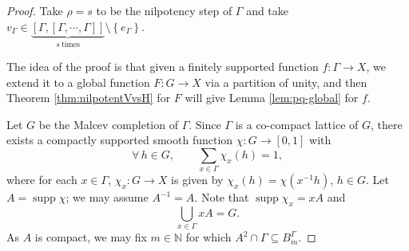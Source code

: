 \documentclass[10pt,a4paper]{amsart}
\begin{document}
\begin{proof}
Take $\rho=s$ to be the nilpotency step of $\Gamma$ and take $v_\Gamma \in \underbrace{\left[\Gamma,\left[\Gamma,\cdots,\Gamma\right]\right]}_{s\mathrm{~times}}\setminus\left\{e_{\Gamma}\right\}$. 

The idea of the proof is that given a finitely supported function $f:\Gamma\to X$, we extend it to a global function $F:G\to X$ via a partition of unity, and then Theorem \ref{thm:nilpotentVvsH} for $F$ will give Lemma \ref{lem:pq-global} for $f$.

Let $G$ be the Malcev completion of $\Gamma$. Since $\Gamma$ is a co-compact lattice of $G$, there exists a compactly supported smooth function $\chi:G\to \left[0,1\right]$ with
\begin{equation}\label{eq:partition of unity}
\forall\, h\in G,\qquad \sum_{x\in \Gamma} \chi_x\left(h\right)=1,
\end{equation}
where for each $x\in \Gamma$, $\chi_x:G\to X$ is given by $\chi_x\left(h\right)=\chi\left(x^{-1}h\right)$, $h\in G$. Let $A=\operatorname{supp}\chi$; we may assume $A^{-1}=A$. Note that $\operatorname{supp}\chi_x=xA$ and
\[
\bigcup_{x\in \Gamma}xA=G.
\]
As $A$ is compact, we may fix $m\in \mathbb{N}$ for which $A^2\cap \Gamma\subseteq B^\Gamma_m$.


\end{proof}
\end{document}
